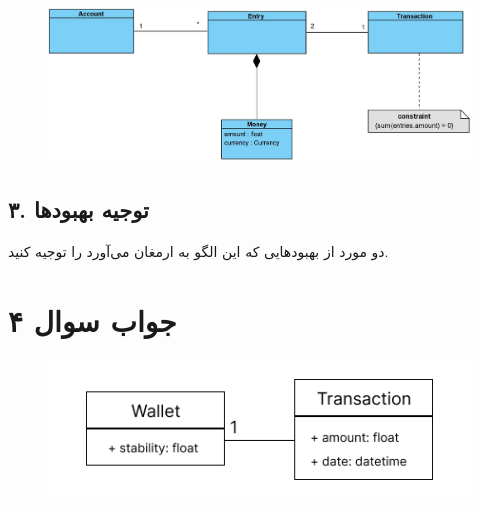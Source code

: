 \begin{figure}[h]
	\centering
	\includegraphics{pic2.jpg}
	\label{fig:label4}
\end{figure}

\subsection*{۳. توجیه بهبود‌ها}
دو مورد از بهبود‌هایی که این الگو به ارمغان می‌آورد را توجیه کنید.

\section*{جواب سوال ۴}

\begin{figure}[h]
	\centering
	\includegraphics{pic3.png}
	\label{fig:label4}
\end{figure}